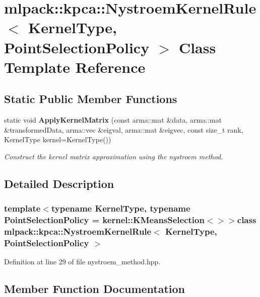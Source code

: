 \section{mlpack\-:\-:kpca\-:\-:Nystroem\-Kernel\-Rule$<$ Kernel\-Type, Point\-Selection\-Policy $>$ Class Template Reference}
\label{classmlpack_1_1kpca_1_1NystroemKernelRule}
\subsection*{Static Public Member Functions}
\begin{DoxyCompactItemize}
\item 
static void {\bf Apply\-Kernel\-Matrix} (const arma\-::mat \&data, arma\-::mat \&transformed\-Data, arma\-::vec \&eigval, arma\-::mat \&eigvec, const size\-\_\-t rank, Kernel\-Type kernel=Kernel\-Type())
\begin{DoxyCompactList}\small\item\em Construct the kernel matrix approximation using the nystroem method. \end{DoxyCompactList}\end{DoxyCompactItemize}


\subsection{Detailed Description}
\subsubsection*{template$<$typename Kernel\-Type, typename Point\-Selection\-Policy = kernel\-::\-K\-Means\-Selection$<$$>$$>$class mlpack\-::kpca\-::\-Nystroem\-Kernel\-Rule$<$ Kernel\-Type, Point\-Selection\-Policy $>$}



Definition at line 29 of file nystroem\-\_\-method.\-hpp.



\subsection{Member Function Documentation}
